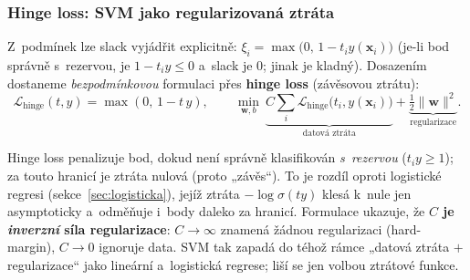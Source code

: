 \begin{center}
\end{center}

\subsubsection*{Hinge loss: SVM jako regularizovaná ztráta}

Z~podmínek lze slack vyjádřit explicitně: $\xi_i=\max\big(0,\,1-t_i y(\mathbf{x}_i)\big)$ (je-li bod správně s~rezervou, je $1-t_iy\le 0$ a~slack je $0$; jinak je kladný). Dosazením dostaneme \emph{bezpodmínkovou} formulaci přes \textbf{hinge loss} (závěsovou ztrátu):
\[ \mathcal{L}_{\text{hinge}}(t,y) = \max(0,\,1-t\,y),\qquad \min_{\mathbf{w},b}\ \underbrace{C\sum_i \mathcal{L}_{\text{hinge}}\big(t_i,y(\mathbf{x}_i)\big)}_{\text{datová ztráta}} + \underbrace{\tfrac12\|\mathbf{w}\|^2}_{\text{regularizace}}. \]

\begin{intuice}
Hinge loss penalizuje bod, dokud není správně klasifikován \emph{s~rezervou} ($t_i y\ge 1$); za touto hranicí je ztráta nulová (proto „závěs``). To je rozdíl oproti logistické regresi (sekce~\ref{sec:logisticka}), jejíž ztráta $-\log\sigma(ty)$ klesá k~nule jen asymptoticky a~odměňuje i~body daleko za hranicí. Formulace ukazuje, že \textbf{$C$ je \emph{inverzní} síla regularizace}: $C\to\infty$ znamená žádnou regularizaci (hard-margin), $C\to 0$ ignoruje data. SVM tak zapadá do téhož rámce „datová ztráta $+$ regularizace`` jako lineární a~logistická regrese; liší se jen volbou ztrátové funkce.
\end{intuice}

